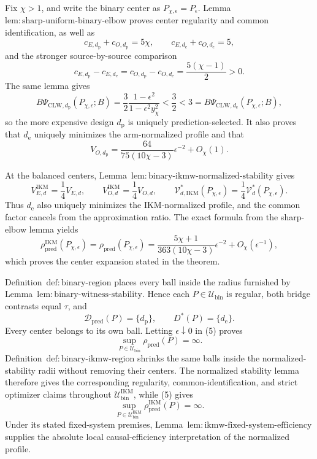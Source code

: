Fix \(\chi>1\), and write the binary center as \(P_{\chi,\epsilon}=P_\epsilon\). Lemma~\(\mathrm{lem{:}sharp\text{-}uniform\text{-}binary\text{-}elbow}\) proves center regularity and common identification, as well as
\[
 c_{E,d_{\mathrm p}}+c_{O,d_{\mathrm p}}=5\chi,
 \qquad
 c_{E,d_{\mathrm e}}+c_{O,d_{\mathrm e}}=5,
\]
and the stronger source-by-source comparison
\[
 c_{E,d_{\mathrm p}}-c_{E,d_{\mathrm e}}
 =c_{O,d_{\mathrm p}}-c_{O,d_{\mathrm e}}
 =\frac{5(\chi-1)}2>0.                                \tag{1}
\]
The same lemma gives
\[
 B\Psi_{\mathrm{CLW},d_{\mathrm p}}(P_{\chi,\epsilon};B)
 =\frac32\frac{1-\epsilon^2}{1-\epsilon^2y_\chi^2}
 <\frac32<3
 =B\Psi_{\mathrm{CLW},d_{\mathrm e}}(P_{\chi,\epsilon};B), \tag{2}
\]
so the more expensive design \(d_{\mathrm p}\) is uniquely prediction-selected. It also proves that \(d_{\mathrm e}\) uniquely minimizes the arm-normalized profile and that
\[
 V_{O,d_{\mathrm p}}
 =\frac{64}{75(10\chi-3)}\epsilon^{-2}+O_\chi(1).      \tag{3}
\]

At the balanced centers, Lemma~\(\mathrm{lem{:}binary\text{-}ikmw\text{-}normalized\text{-}stability}\) gives
\[
 V_{E,d}^{\mathrm{IKM}}=\frac14V_{E,d},
 \qquad
 V_{O,d}^{\mathrm{IKM}}=\frac14V_{O,d},
 \qquad
 \mathcal V_{d,\mathrm{IKM}}^*(P_{\chi,\epsilon})
 =\frac14\mathcal V_d^*(P_{\chi,\epsilon}).           \tag{4}
\]
Thus \(d_{\mathrm e}\) also uniquely minimizes the IKM-normalized profile, and the common factor cancels from the approximation ratio. The exact formula from the sharp-elbow lemma yields
\[
 \rho_{\mathrm{pred}}^{\mathrm{IKM}}(P_{\chi,\epsilon})
 =\rho_{\mathrm{pred}}(P_{\chi,\epsilon})
 =\frac{5\chi+1}{363(10\chi-3)}\epsilon^{-2}
 +O_\chi(\epsilon^{-1}),                              \tag{5}
\]
which proves the center expansion stated in the theorem.

Definition~\(\mathrm{def{:}binary\text{-}region}\) places every ball inside the radius furnished by Lemma~\(\mathrm{lem{:}binary\text{-}witness\text{-}stability}\). Hence each \(P\in\mathcal U_{\mathrm{bin}}\) is regular, both bridge contrasts equal \(\tau\), and
\[
 \mathcal D_{\mathrm{pred}}(P)=\{d_{\mathrm p}\},
 \qquad
 D^*(P)=\{d_{\mathrm e}\}.                            \tag{6}
\]
Every center belongs to its own ball. Letting \(\epsilon\downarrow0\) in (5) proves
\[
 \sup_{P\in\mathcal U_{\mathrm{bin}}}\rho_{\mathrm{pred}}(P)=\infty. \tag{7}
\]
Definition~\(\mathrm{def{:}binary\text{-}ikmw\text{-}region}\) shrinks the same balls inside the normalized-stability radii without removing their centers. The normalized stability lemma therefore gives the corresponding regularity, common-identification, and strict optimizer claims throughout \(\mathcal U_{\mathrm{bin}}^{\mathrm{IKM}}\), while (5) gives
\[
 \sup_{P\in\mathcal U_{\mathrm{bin}}^{\mathrm{IKM}}}
 \rho_{\mathrm{pred}}^{\mathrm{IKM}}(P)=\infty.       \tag{8}
\]
Under its stated fixed-system premises, Lemma~\(\mathrm{lem{:}ikmw\text{-}fixed\text{-}system\text{-}efficiency}\) supplies the absolute local causal-efficiency interpretation of the normalized profile.

